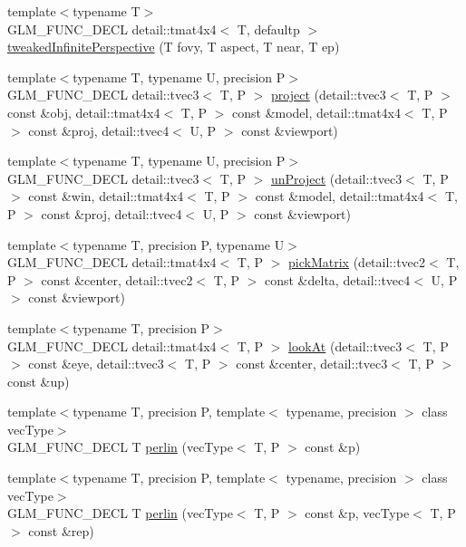 \begin{CompactItemize}
\item 
{\footnotesize template$<$typename T$>$ }\\GLM\_\-FUNC\_\-DECL detail::tmat4x4$<$ T, defaultp $>$ \hyperlink{group__gtc__matrix__transform_gb4748de5e549cbd83682c9d28a9ccdac}{tweakedInfinitePerspective} (T fovy, T aspect, T near, T ep)
\item 
{\footnotesize template$<$typename T, typename U, precision P$>$ }\\GLM\_\-FUNC\_\-DECL detail::tvec3$<$ T, P $>$ \hyperlink{group__gtc__matrix__transform_ge6de64f8b0a55befb0e296475c6f0c79}{project} (detail::tvec3$<$ T, P $>$ const \&obj, detail::tmat4x4$<$ T, P $>$ const \&model, detail::tmat4x4$<$ T, P $>$ const \&proj, detail::tvec4$<$ U, P $>$ const \&viewport)
\item 
{\footnotesize template$<$typename T, typename U, precision P$>$ }\\GLM\_\-FUNC\_\-DECL detail::tvec3$<$ T, P $>$ \hyperlink{group__gtc__matrix__transform_g90b6f19047316d870f88e0a50d8b13f3}{unProject} (detail::tvec3$<$ T, P $>$ const \&win, detail::tmat4x4$<$ T, P $>$ const \&model, detail::tmat4x4$<$ T, P $>$ const \&proj, detail::tvec4$<$ U, P $>$ const \&viewport)
\item 
{\footnotesize template$<$typename T, precision P, typename U$>$ }\\GLM\_\-FUNC\_\-DECL detail::tmat4x4$<$ T, P $>$ \hyperlink{group__gtc__matrix__transform_g42972db8a1c73829999a8454d11fa4a3}{pickMatrix} (detail::tvec2$<$ T, P $>$ const \&center, detail::tvec2$<$ T, P $>$ const \&delta, detail::tvec4$<$ U, P $>$ const \&viewport)
\item 
{\footnotesize template$<$typename T, precision P$>$ }\\GLM\_\-FUNC\_\-DECL detail::tmat4x4$<$ T, P $>$ \hyperlink{group__gtc__matrix__transform_g7f4f81d4b0d7b492112eb4d5b184d9be}{lookAt} (detail::tvec3$<$ T, P $>$ const \&eye, detail::tvec3$<$ T, P $>$ const \&center, detail::tvec3$<$ T, P $>$ const \&up)
\item 
{\footnotesize template$<$typename T, precision P, template$<$ typename, precision $>$ class vecType$>$ }\\GLM\_\-FUNC\_\-DECL T \hyperlink{group__gtc__noise_g81bdad1f7221a08af5ea462c98f692f7}{perlin} (vecType$<$ T, P $>$ const \&p)
\item 
{\footnotesize template$<$typename T, precision P, template$<$ typename, precision $>$ class vecType$>$ }\\GLM\_\-FUNC\_\-DECL T \hyperlink{group__gtc__noise_gfdb3eb82b2d5a45159a6425acd6ff398}{perlin} (vecType$<$ T, P $>$ const \&p, vecType$<$ T, P $>$ const \&rep)

\end{CompactItemize}
